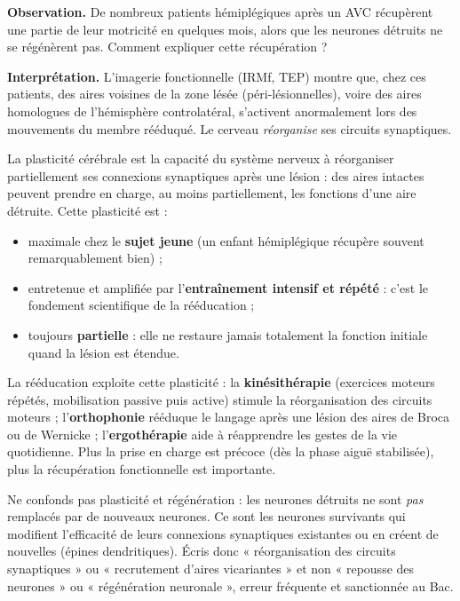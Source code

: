\documentclass[11pt]{article}
\newcommand{\cle}[1]{{\popxbold\color{popdark}#1}}
\newcounter{popsec}
\newcounter{popsub}
\newcommand{\courssub}[1]{%
  \stepcounter{popsub}%
  \par\vspace{9pt}\noindent{\popxbold\fontsize{11.5}{13}\selectfont\color{popink}{\color{poporange}\thepopsec.\thepopsub}\hspace{6pt}#1}\par\nopagebreak\vspace{4pt}
}
\begin{document}
\courssub{Rééducation et plasticité cérébrale}

\textbf{Observation.} De nombreux patients hémiplégiques après un AVC récupèrent une partie de leur motricité en quelques mois, alors que les neurones détruits ne se régénèrent pas. Comment expliquer cette récupération ?

\textbf{Interprétation.} L'imagerie fonctionnelle (IRMf, TEP) montre que, chez ces patients, des aires voisines de la zone lésée (péri-lésionnelles), voire des aires homologues de l'hémisphère controlatéral, s'activent anormalement lors des mouvements du membre rééduqué. Le cerveau \emph{réorganise} ses circuits synaptiques.

\begin{propriete}
La \cle{plasticité cérébrale} est la capacité du système nerveux à réorganiser partiellement ses connexions synaptiques après une lésion : des aires intactes peuvent prendre en charge, au moins partiellement, les fonctions d'une aire détruite. Cette plasticité est :
\begin{itemize}
\item maximale chez le \textbf{sujet jeune} (un enfant hémiplégique récupère souvent remarquablement bien) ;
\item entretenue et amplifiée par l'\textbf{entraînement intensif et répété} : c'est le fondement scientifique de la rééducation ;
\item toujours \textbf{partielle} : elle ne restaure jamais totalement la fonction initiale quand la lésion est étendue.
\end{itemize}
\end{propriete}

La \cle{rééducation} exploite cette plasticité : la \textbf{kinésithérapie} (exercices moteurs répétés, mobilisation passive puis active) stimule la réorganisation des circuits moteurs ; l'\textbf{orthophonie} rééduque le langage après une lésion des aires de Broca ou de Wernicke ; l'\textbf{ergothérapie} aide à réapprendre les gestes de la vie quotidienne. Plus la prise en charge est précoce (dès la phase aiguë stabilisée), plus la récupération fonctionnelle est importante.

\begin{attention}
Ne confonds pas plasticité et régénération : les neurones détruits ne sont \emph{pas} remplacés par de nouveaux neurones. Ce sont les neurones survivants qui modifient l'efficacité de leurs connexions synaptiques existantes ou en créent de nouvelles (épines dendritiques). Écris donc « réorganisation des circuits synaptiques » ou « recrutement d'aires vicariantes » et non « repousse des neurones » ou « régénération neuronale », erreur fréquente et sanctionnée au Bac.
\end{attention}
\end{document}
